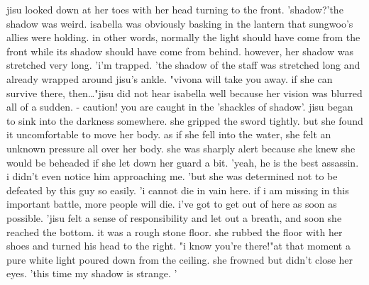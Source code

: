 jisu looked down at her toes with her head turning to the front.
'shadow?'the shadow was weird.
 isabella was obviously basking in the lantern that sungwoo's allies were holding.
 in other words, normally the light should have come from the front while its shadow should have come from behind.
 however, her shadow was stretched very long.
'i'm trapped.
'the shadow of the staff was stretched long and already wrapped around jisu's ankle.
"vivona will take you away.
 if she can survive there, then…"jisu did not hear isabella well because her vision was blurred all of a sudden.
- caution! you are caught in the 'shackles of shadow'.
jisu began to sink into the darkness somewhere.
 she gripped the sword tightly.
 but she found it uncomfortable to move her body.
 as if she fell into the water, she felt an unknown pressure all over her body.
 she was sharply alert because she knew she would be beheaded if she let down her guard a bit.
'yeah, he is the best assassin.
 i didn't even notice him approaching me.
'but she was determined not to be defeated by this guy so easily.
'i cannot die in vain here.
 if i am missing in this important battle, more people will die.
 i've got to get out of here as soon as possible.
'jisu felt a sense of responsibility and let out a breath, and soon she reached the bottom.
it was a rough stone floor.
 she rubbed the floor with her shoes and turned his head to the right.
"i know you're there!"at that moment a pure white light poured down from the ceiling.
she frowned but didn't close her eyes.
'this time my shadow is strange.
'

 